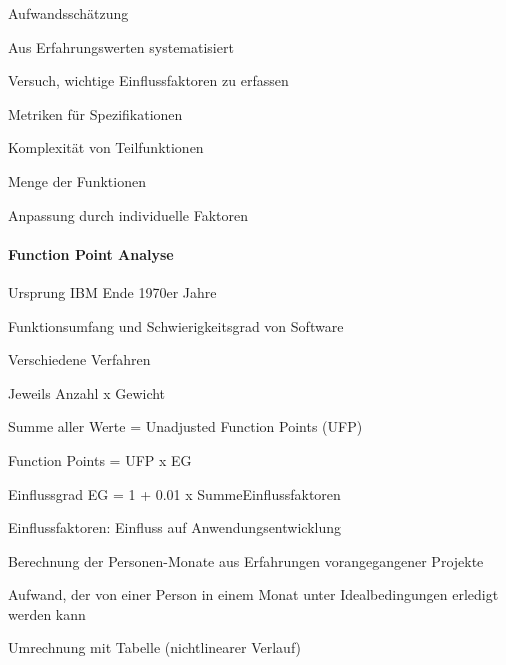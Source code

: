 \documentclass[a4paper]{article}
\begin{document}
\begin{multicols}{3}
  Aufwandsschätzung
  \begin{itemize*}
    \item Aus Erfahrungswerten systematisiert
    \item Versuch, wichtige Einflussfaktoren zu erfassen
    \begin{itemize*}
      \item Metriken für Spezifikationen
      \item Komplexität von Teilfunktionen
      \item Menge der Funktionen
      \item Anpassung durch individuelle Faktoren
    \end{itemize*}
  \end{itemize*}

  \paragraph{Function Point Analyse}
  \begin{itemize*}
    \item Ursprung IBM Ende 1970er Jahre
    \item Funktionsumfang und Schwierigkeitsgrad von Software
    \item Verschiedene Verfahren
    \item Jeweils Anzahl x Gewicht
    \item Summe aller Werte = Unadjusted Function Points (UFP)
    \item Function Points = UFP x EG
    \item Einflussgrad EG = 1 + 0.01 x SummeEinflussfaktoren
    \item Einflussfaktoren: Einfluss auf Anwendungsentwicklung
    \item Berechnung der Personen-Monate aus Erfahrungen vorangegangener Projekte
    \begin{itemize*}
      \item Aufwand, der von einer Person in einem Monat unter Idealbedingungen erledigt werden kann
    \end{itemize*}
    \item Umrechnung mit Tabelle (nichtlinearer Verlauf)
  \end{itemize*}


\end{multicols}
\end{document}
